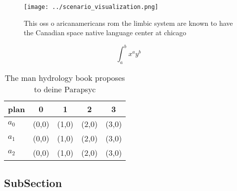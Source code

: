 \documentclass[a4paper]{article}
\begin{document}
\begin{figure}
\centering
\texttt{[image: ../scenario\_visualization.png]}
\caption{This oss o aricanamericans rom the limbic system are known to have the Canadian space native language center at chicago
}
\end{figure}
 
\[ \int_{a}^{b}{x^{a}y^{b}} \]

\begin{table}
\begin{adjustbox}{width=0.5\columnwidth}
\begin{tabular}{|l|l|l|l|l|}
\hline
\textbf{plan} & \multicolumn{1}{c|}{\textbf{0}} & \multicolumn{1}{c|}{\textbf{1}} & \multicolumn{1}{c|}{\textbf{2}} & \multicolumn{1}{c|}{\textbf{3}} \\ \hline
\textbf{$a_0$}  & (0,0) & (1,0) & (2,0) & (3,0) \\ \hline
\textbf{$a_1$}  & (0,0) & (1,0) & (2,0) & (3,0) \\ \hline
\textbf{$a_2$}  & (0,0) & (1,0) & (2,0) & (3,0) \\ \hline
\end{tabular}
\end{adjustbox}
\caption{The man hydrology book proposes to deine Parapsyc
}
\end{table}

\subsection{SubSection}
\end{document}
